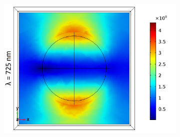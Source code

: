 \begin{figure}[htb!]
\begin{subfigure}{0.32\textwidth}
        \centering
        \includegraphics[width=\linewidth]{figures/ch4/S5A/FieldDistribution/LSPR/Sample5A_TE_Slice@z=-05t_wl=725_notitle.png}
   \end{subfigure}
   \vspace{0.7cm}
   

\end{figure}
